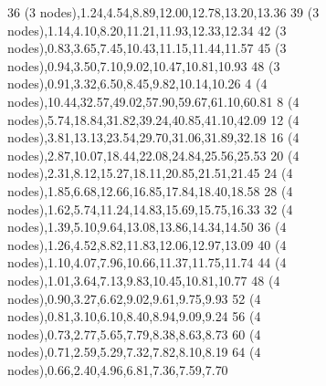 \documentclass[11pt]{article}
\begin{document}
\begin{table}[H]
{36 (3 nodes),1.24,4.54,8.89,12.00,12.78,13.20,13.36
39 (3 nodes),1.14,4.10,8.20,11.21,11.93,12.33,12.34
42 (3 nodes),0.83,3.65,7.45,10.43,11.15,11.44,11.57
45 (3 nodes),0.94,3.50,7.10,9.02,10.47,10.81,10.93
48 (3 nodes),0.91,3.32,6.50,8.45,9.82,10.14,10.26
4 (4 nodes),10.44,32.57,49.02,57.90,59.67,61.10,60.81
8 (4 nodes),5.74,18.84,31.82,39.24,40.85,41.10,42.09
12 (4 nodes),3.81,13.13,23.54,29.70,31.06,31.89,32.18
16 (4 nodes),2.87,10.07,18.44,22.08,24.84,25.56,25.53
20 (4 nodes),2.31,8.12,15.27,18.11,20.85,21.51,21.45
24 (4 nodes),1.85,6.68,12.66,16.85,17.84,18.40,18.58
28 (4 nodes),1.62,5.74,11.24,14.83,15.69,15.75,16.33
32 (4 nodes),1.39,5.10,9.64,13.08,13.86,14.34,14.50
36 (4 nodes),1.26,4.52,8.82,11.83,12.06,12.97,13.09
40 (4 nodes),1.10,4.07,7.96,10.66,11.37,11.75,11.74
44 (4 nodes),1.01,3.64,7.13,9.83,10.45,10.81,10.77
48 (4 nodes),0.90,3.27,6.62,9.02,9.61,9.75,9.93
52 (4 nodes),0.81,3.10,6.10,8.40,8.94,9.09,9.24
56 (4 nodes),0.73,2.77,5.65,7.79,8.38,8.63,8.73
60 (4 nodes),0.71,2.59,5.29,7.32,7.82,8.10,8.19
64 (4 nodes),0.66,2.40,4.96,6.81,7.36,7.59,7.70
}
\end{table}
\end{document}
